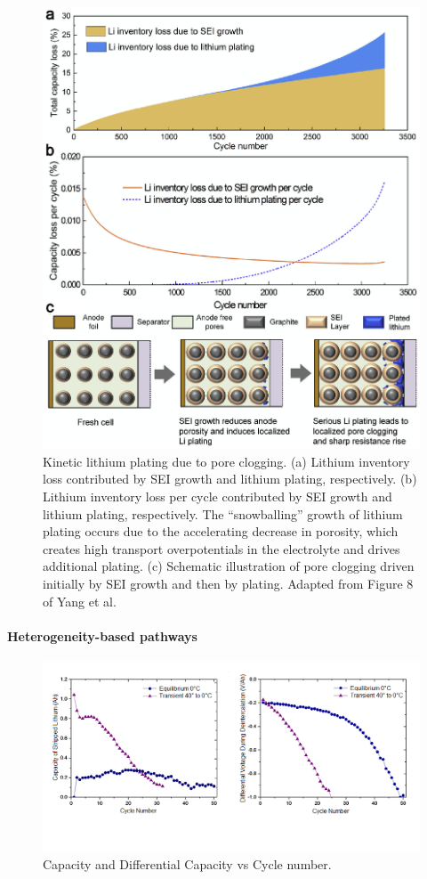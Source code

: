 \documentclass[journal=jpcl, manuscript=article, layout=onecolumn]{achemso}
\begin{document}
\begin{figure}[ht]
    \centering
    \includegraphics[width=0.7\linewidth]{figures/li_plating_porosity_yang.eps}
    \caption{Kinetic lithium plating due to pore clogging. (a) Lithium inventory loss contributed by SEI growth and lithium plating, respectively. (b) Lithium inventory loss per cycle contributed by SEI growth and lithium plating, respectively. The ``snowballing'' growth of lithium plating occurs due to the accelerating decrease in porosity, which creates high transport overpotentials in the electrolyte and drives additional plating. (c) Schematic illustration of pore clogging driven initially by SEI growth and then by plating. Adapted from Figure 8 of Yang et al.\cite{yang_modeling_2017}}
    \label{fig:pore_clogging}
\end{figure}

\paragraph{Heterogeneity-based pathways}

\begin{figure}[ht]
\centering
\includegraphics[scale = 0.6]{images/Capacity & Diff Voltage.png}
\caption{Capacity and Differential Capacity vs Cycle number.}
\label{fig:CapDiffCapCycle}
\end{figure}
\end{document}
